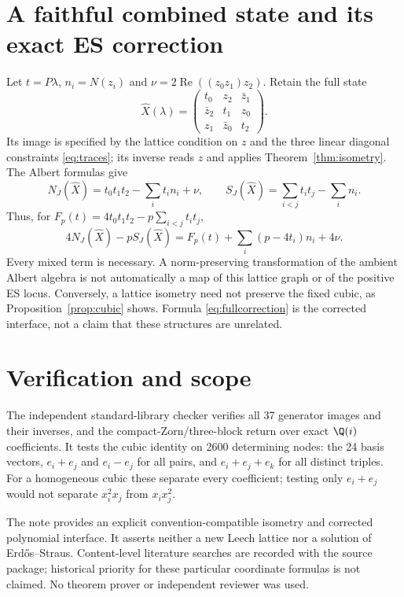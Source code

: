 \section{A faithful combined state and its exact ES correction}
Let $t=P\lambda$, $n_i=N(z_i)$ and $\nu=2\operatorname{Re}((z_0z_1)z_2)$. Retain the full state
\[
\widehat X(\lambda)=\begin{pmatrix}t_0&z_2&\bar z_1\\\bar z_2&t_1&z_0\\z_1&\bar z_0&t_2\end{pmatrix}.
\]
Its image is specified by the lattice condition on $z$ and the three linear diagonal constraints \eqref{eq:traces}; its inverse reads $z$ and applies Theorem~\ref{thm:isometry}. The Albert formulas give
\[
N_J(\widehat X)=t_0t_1t_2-\sum_i t_in_i+\nu,
\qquad S_J(\widehat X)=\sum_{i<j}t_it_j-\sum_i n_i.
\]
Thus, for $F_p(t)=4t_0t_1t_2-p\sum_{i<j}t_it_j$,
\begin{equation}\label{eq:fullcorrection}
\boxed{4N_J(\widehat X)-pS_J(\widehat X)
=F_p(t)+\sum_i(p-4t_i)n_i+4\nu.}
\end{equation}
Every mixed term is necessary. A norm-preserving transformation of the ambient Albert algebra is not automatically a map of this lattice graph or of the positive ES locus. Conversely, a lattice isometry need not preserve the fixed cubic, as Proposition~\ref{prop:cubic} shows. Formula \eqref{eq:fullcorrection} is the corrected interface, not a claim that these structures are unrelated.

\section{Verification and scope}
The independent standard-library checker verifies all 37 generator images and their inverses, and the compact-Zorn/three-block return over exact $\Q(i)$ coefficients. It tests the cubic identity on 2600 determining nodes: the 24 basis vectors, $e_i+e_j$ and $e_i-e_j$ for all pairs, and $e_i+e_j+e_k$ for all distinct triples. For a homogeneous cubic these separate every coefficient; testing only $e_i+e_j$ would not separate $x_i^2x_j$ from $x_ix_j^2$.

The note provides an explicit convention-compatible isometry and corrected polynomial interface. It asserts neither a new Leech lattice nor a solution of Erd\H{o}s--Straus. Content-level literature searches are recorded with the source package; historical priority for these particular coordinate formulas is not claimed. No theorem prover or independent reviewer was used.
